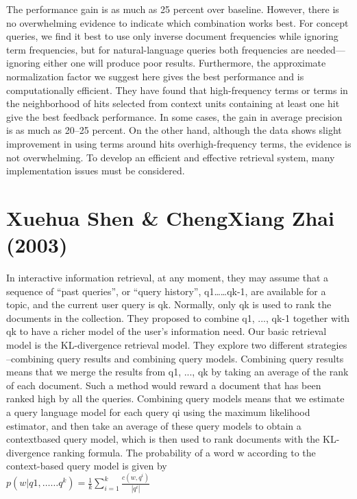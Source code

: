 The performance gain is as much as 25 percent over baseline. However, there is no overwhelming evidence to indicate which combination works best. For concept queries, we find it best to use only inverse document frequencies while ignoring term frequencies, but for natural-language queries both frequencies are needed— ignoring either one will produce poor results. Furthermore, the approximate normalization factor we suggest here gives the best performance and is computationally efficient. They have found that high-frequency terms or terms in the neighborhood of hits selected from context units containing at least one hit give the best feedback performance. In some cases, the gain in average precision is as much as 20–25 percent. On the other hand, although the data shows slight improvement in using terms around hits overhigh-frequency terms, the evidence is not overwhelming. To develop an efficient and effective retrieval system, many implementation issues must be considered.



\section{Xuehua Shen \& ChengXiang Zhai (2003)}

In interactive information retrieval, at any moment, they  may assume that a sequence of “past queries”, or “query history”, q1……qk-1, are available for a topic, and the current user query is qk. Normally, only qk is used to rank the documents in the collection. They proposed to combine q1, ..., qk-1 together with qk to have a richer model of the user’s information need. Our basic retrieval model is the KL-divergence retrieval model. 
They explore two different strategies –combining query results and combining query models. Combining query results means that we merge the results from q1, ..., qk by taking an average of the rank of each document. Such a method would reward a document that has been ranked high by all the queries. Combining query models means that we estimate a query language model for each query qi using the maximum likelihood estimator, and then take an average of these query models to obtain a contextbased query model, which is then used to rank documents with the KL-divergence ranking formula.
The probability of a word w according to the context-based query model is given by\\


\(p(w|q1,……q^k) = \frac{1}{k}\sum_{i=1}^{k}\frac{c(w,q^i)}{|q^i|}\)\\

